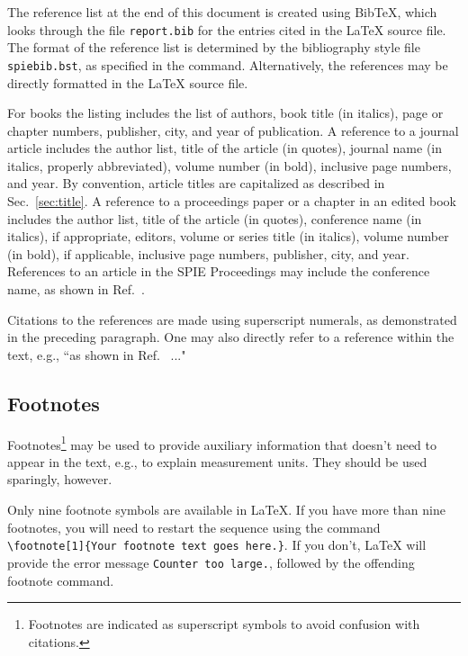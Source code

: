 \documentclass[]{spie}  %
\begin{document}
The reference list at the end of this document is created using
BibTeX, which looks through the file {\tt report.bib} for the entries
cited in the LaTeX source file.  The format of the reference list is
determined by the bibliography style file {\tt spiebib.bst}, as
specified in the \verb|| command.
Alternatively, the references may be directly formatted in the LaTeX
source file.

For books\cite{Lamport94,Alred03,Goossens97} the listing includes the
list of authors, book title (in italics), page or chapter numbers,
publisher, city, and year of publication.  A reference to a journal
article\cite{Metropolis53} includes the author list, title of the
article (in quotes), journal name (in italics, properly abbreviated),
volume number (in bold), inclusive page numbers, and year.  By
convention\cite{Lamport94}, article titles are capitalized as
described in Sec.~\ref{sec:title}.  A reference to a proceedings paper
or a chapter in an edited book\cite{Gull89a} includes the author list,
title of the article (in quotes), conference name (in italics), if
appropriate, editors, volume or series title (in italics), volume
number (in bold), if applicable, inclusive page numbers, publisher,
city, and year.  References to an article in the SPIE Proceedings may
include the conference name, as shown in Ref.~.

Citations to the references are made using superscript numerals, as
demonstrated in the preceding paragraph.  One may also directly refer
to a reference within the text, e.g., ``as shown in
Ref.~ ..."

\subsection{Footnotes}
Footnotes\footnote{Footnotes are indicated as superscript symbols to
  avoid confusion with citations.} may be used to provide auxiliary
information that doesn't need to appear in the text, e.g., to explain
measurement units.  They should be used sparingly, however.

Only nine footnote symbols are available in LaTeX. If you have more
than nine footnotes, you will need to restart the sequence using the
command \verb|\footnote[1]{Your footnote text goes here.}|. If you
don't, LaTeX will provide the error message {\tt Counter too large.},
followed by the offending footnote command.
\end{document}
